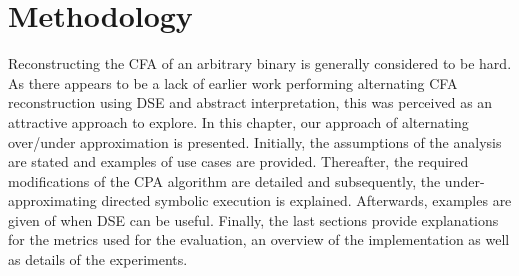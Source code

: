 \documentclass{kththesis}
\newcommand{\fbcomment}[1]{{#1}}
\renewcommand{\fbcomment}[1]{}
\begin{document}
\chapter{Methodology}\label{chap:methodlogy}
\fbcomment{\color{red}Goal: Describe what has been done and why.}
Reconstructing the CFA of an arbitrary binary is generally considered to be hard\cite{Jakstab}. As there appears to be a lack of earlier work performing alternating CFA reconstruction using DSE and abstract interpretation, this was perceived as an attractive approach to explore. In this chapter, our approach of alternating over/under approximation is presented. Initially, the assumptions of the analysis are stated and examples of use cases are provided. Thereafter, the required modifications of the CPA algorithm are detailed and subsequently, the under-approximating directed symbolic execution is explained. Afterwards, examples are given of when DSE can be useful. Finally, the last sections provide explanations for the metrics used for the evaluation, an overview of the implementation as well as details of the experiments.
\clearpage
\end{document}
